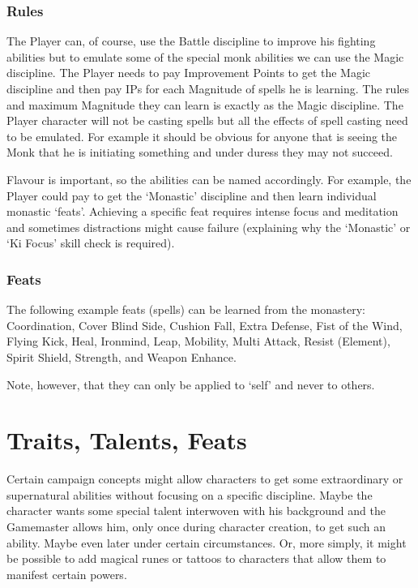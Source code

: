 \subsubsection{Rules}
The Player can, of course, use the Battle discipline to improve his fighting abilities but to emulate some of the special monk abilities we can use the Magic discipline. The Player needs to pay Improvement Points to get the Magic discipline and then pay IPs for each Magnitude of spells he is learning. The rules and maximum Magnitude they can learn is exactly as the Magic discipline. The Player character will not be casting spells but all the effects of spell casting need to be emulated. For example it should be obvious for anyone that is seeing the Monk that he is initiating something and under duress they may not succeed.

Flavour is important, so the abilities can be named accordingly. For example, the Player could pay to get the `Monastic' discipline and then learn individual monastic `feats'. Achieving a specific feat requires intense focus and meditation and sometimes distractions might cause failure (explaining why the `Monastic' or `Ki Focus' skill check is required).

\subsubsection{Feats}
The following example feats (spells) can be learned from the monastery: Coordination, Cover Blind Side, Cushion Fall, Extra Defense, Fist of the Wind, Flying Kick, Heal, Ironmind, Leap, Mobility, Multi Attack, Resist (Element), Spirit Shield, Strength, and Weapon Enhance.

Note, however, that they can only be applied to `self' and never to others.





\section{Traits, Talents, Feats}

Certain campaign concepts might allow characters to get some extraordinary or supernatural abilities without focusing on a specific discipline. Maybe the character wants some special talent interwoven with his background and the Gamemaster allows him, only once during character creation, to get such an ability. Maybe even later under certain circumstances. Or, more simply, it might be possible to add magical runes or tattoos to characters that allow them to manifest certain powers.

